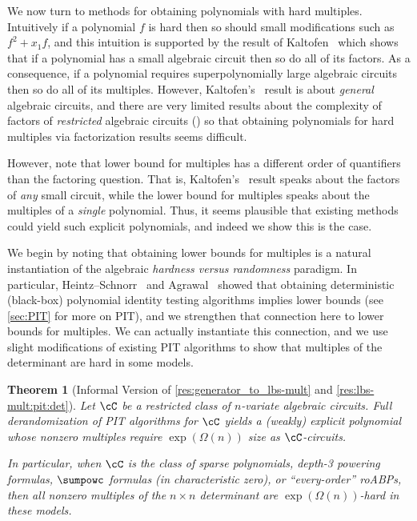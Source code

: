 \documentclass[11pt]{article}
\numberwithin{equation}{section}
\newtheorem{theorem}{Theorem}[section]
\theoremstyle{definition}
\theoremstyle{plain}
\begin{document}
We now turn to methods for obtaining polynomials with hard multiples. Intuitively if a polynomial $f$ is hard then so should small modifications such as $f^2+x_1f$, and this intuition is supported by the result of Kaltofen~\cite{Kaltofen89} which shows that if a polynomial has a small algebraic circuit then so do all of its factors.  As a consequence, if a polynomial requires superpolynomially large algebraic circuits then so do all of its multiples. However, Kaltofen's~\cite{Kaltofen89} result is about \emph{general} algebraic circuits, and there are very limited results about the complexity of factors of \emph{restricted} algebraic circuits (\cite{DvirSY09,Oliveira15}) so that obtaining polynomials for hard multiples via factorization results seems difficult. %

However, note that lower bound for multiples has a different order of quantifiers than the factoring question.  That is, Kaltofen's~\cite{Kaltofen89} result speaks about the factors of \emph{any} small circuit, while the lower bound for multiples speaks about the multiples of a \emph{single} polynomial.  Thus, it seems plausible that existing methods could yield such explicit polynomials, and indeed we show this is the case.

We begin by noting that obtaining lower bounds for multiples is a natural instantiation of the algebraic \emph{hardness versus randomness} paradigm. In particular, Heintz--Schnorr~\cite{HeintzSchnorr80} and Agrawal~\cite{Agrawal05} showed that obtaining deterministic (black-box) polynomial identity testing algorithms implies lower bounds (see \autoref{sec:PIT} for more on PIT), and we strengthen that connection here to lower bounds for multiples.  We can actually instantiate this connection, and we use slight modifications of existing PIT algorithms to show that multiples of the determinant are hard in some models.

\begin{theorem}[Informal Version of \autoref{res:generator_to_lbs-mult} and \autoref{res:lbs-mult:pit:det}]
        Let $\cC$ be a restricted class of $n$-variate algebraic circuits. Full derandomization of PIT algorithms for $\cC$ yields a (weakly) explicit polynomial whose nonzero multiples require
%
$\exp(\Omega(n))$ size as $\cC$-circuits.

        In particular, when $\cC$ is the class of sparse polynomials, depth-3 powering formulas, $\sumpowc$ formulas (in characteristic zero), or ``every-order'' roABPs, then all nonzero multiples of the $n\times n$ determinant are $\exp(\Omega(n))$-hard in these models.
\end{theorem}
\end{document}
